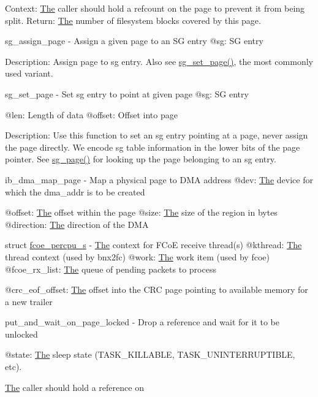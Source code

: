 Context\+: \mbox{\hyperlink{classThe}{The}} caller should hold a refcount on the page to prevent it from being split. Return\+: \mbox{\hyperlink{classThe}{The}} number of filesystem blocks covered by this page.

sg\+\_\+assign\+\_\+page -\/ Assign a given page to an SG entry @sg\+: SG entry

Description\+: Assign page to sg entry. Also see \mbox{\hyperlink{scatterlist_8h_a239b3f3fcb0ed4d33b62648ad4679429}{sg\+\_\+set\+\_\+page()}}, the most commonly used variant.

sg\+\_\+set\+\_\+page -\/ Set sg entry to point at given page @sg\+: SG entry

@len\+: Length of data @offset\+: Offset into page

Description\+: Use this function to set an sg entry pointing at a page, never assign the page directly. We encode sg table information in the lower bits of the page pointer. See \mbox{\hyperlink{scatterlist_8h_aad7aad94cc6e462737b2ae514fa9a6eb}{sg\+\_\+page()}} for looking up the page belonging to an sg entry.

ib\+\_\+dma\+\_\+map\+\_\+page -\/ Map a physical page to D\+MA address @dev\+: \mbox{\hyperlink{classThe}{The}} device for which the dma\+\_\+addr is to be created

@offset\+: \mbox{\hyperlink{classThe}{The}} offset within the page @size\+: \mbox{\hyperlink{classThe}{The}} size of the region in bytes @direction\+: \mbox{\hyperlink{classThe}{The}} direction of the D\+MA

struct \mbox{\hyperlink{structfcoe__percpu__s}{fcoe\+\_\+percpu\+\_\+s}} -\/ \mbox{\hyperlink{classThe}{The}} context for F\+CoE receive thread(s) @kthread\+: \mbox{\hyperlink{classThe}{The}} thread context (used by bnx2fc) @work\+: \mbox{\hyperlink{classThe}{The}} work item (used by fcoe) @fcoe\+\_\+rx\+\_\+list\+: \mbox{\hyperlink{classThe}{The}} queue of pending packets to process

@crc\+\_\+eof\+\_\+offset\+: \mbox{\hyperlink{classThe}{The}} offset into the C\+RC page pointing to available memory for a new trailer

put\+\_\+and\+\_\+wait\+\_\+on\+\_\+page\+\_\+locked -\/ Drop a reference and wait for it to be unlocked

@state\+: \mbox{\hyperlink{classThe}{The}} sleep state (T\+A\+S\+K\+\_\+\+K\+I\+L\+L\+A\+B\+LE, T\+A\+S\+K\+\_\+\+U\+N\+I\+N\+T\+E\+R\+R\+U\+P\+T\+I\+B\+LE, etc).

\mbox{\hyperlink{classThe}{The}} caller should hold a reference on

